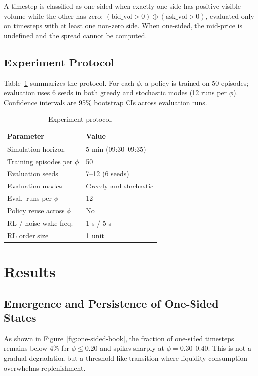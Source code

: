 \documentclass[sigconf]{acmart}
\begin{document}
A timestep is classified as one-sided when exactly one side has positive visible volume while the other has zero: $(\text{bid\_vol} > 0) \oplus (\text{ask\_vol} > 0)$, evaluated only on timesteps with at least one non-zero side. When one-sided, the mid-price is undefined and the spread cannot be computed.

\subsection{Experiment Protocol}

Table~\ref{tab:protocol} summarizes the protocol. For each $\phi$, a policy is trained on 50 episodes; evaluation uses 6 seeds in both greedy and stochastic modes (12 runs per $\phi$). Confidence intervals are 95\% bootstrap CIs across evaluation runs.

\begin{table}[htbp]
\caption{Experiment protocol.}
\label{tab:protocol}
\begin{tabular}{@{}p{}p{}@{}}
\toprule
Parameter & Value \\
\midrule
Simulation horizon & 5 min (09:30--09:35) \\
Training episodes per $\phi$ & 50 \\
Evaluation seeds & 7--12 (6 seeds) \\
Evaluation modes & Greedy and stochastic \\
Eval.\ runs per $\phi$ & 12 \\
Policy reuse across $\phi$ & No \\
RL / noise wake freq.\ & 1 s / 5 s \\
RL order size & 1 unit \\
\bottomrule
\end{tabular}
\end{table}

\section{Results}

\subsection{Emergence and Persistence of One-Sided States}

As shown in Figure~\ref{fig:one-sided-book}, the fraction of one-sided timesteps remains below 4\% for $\phi \leq 0.20$ and spikes sharply at $\phi = 0.30$--$0.40$. This is not a gradual degradation but a threshold-like transition where liquidity consumption overwhelms replenishment.
\end{document}
